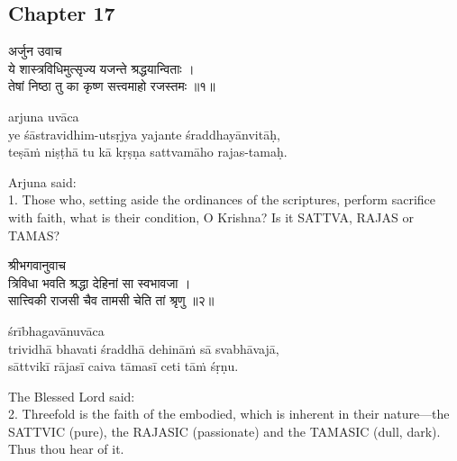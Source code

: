 \chapterdrop

\begin{center}

\headerspace
{}

\section{Chapter 17}

\headerspace
{}

\headerspace
{}

\headerspace
{}

\headerspace
\end{center}

\begin{gitaverse}
अर्जुन उवाच \\
ये शास्त्रविधिमुत्सृज्य यजन्ते श्रद्धयान्विताः । \\
तेषां निष्ठा तु का कृष्ण सत्त्वमाहो रजस्तमः ॥१॥
\end{gitaverse}

\begin{transliteration}
arjuna uvāca \\
ye śāstravidhim-utsṛjya yajante śraddhayānvitāḥ, \\
teṣāṁ niṣṭhā tu kā kṛṣṇa sattvamāho rajas-tamaḥ.
\end{transliteration}

Arjuna said: \\
1. Those who, setting aside the ordinances of the scriptures, perform sacrifice
with faith, what is their condition, O Krishna? Is it SATTVA, RAJAS or TAMAS?\@

\begin{gitaverse}
श्रीभगवानुवाच \\
त्रिविधा भवति श्रद्धा देहिनां सा स्वभावजा । \\
सात्त्विकी राजसी चैव तामसी चेति तां श्रृणु ॥२॥
\end{gitaverse}

\begin{transliteration}
śrībhagavānuvāca \\
trividhā bhavati śraddhā dehināṁ sā svabhāvajā, \\
sāttvikī rājasī caiva tāmasī ceti tāṁ śṛṇu.
\end{transliteration}

The Blessed Lord said: \\
2. Threefold is the faith of the embodied, which is inherent in their
nature---the SATTVIC (pure), the RAJASIC (passionate) and the TAMASIC (dull,
dark). Thus thou hear of it.

